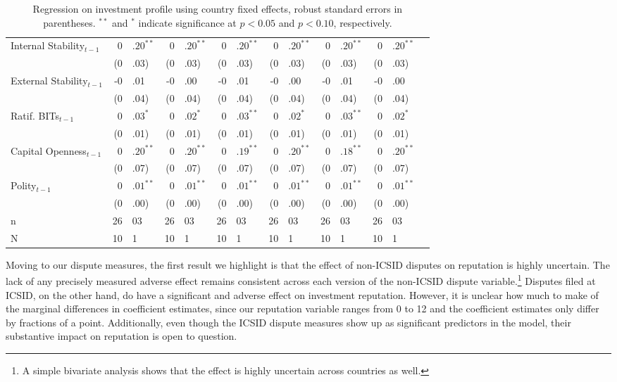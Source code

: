 \documentclass[12pt,onesided]{amsart}
\begin{document}
\begin{table}[ht]
{\begin{tabular}{lr@{} lr@{}lr@{}lr@{} lr@{}lr@{}lr@{} }
  Internal Stability$_{t-1}$ & $0$&$.20^{\ast\ast}$ & $0$&$.20^{\ast\ast}$ & $0$&$.20^{\ast\ast}$ & $0$&$.20^{\ast\ast}$ & $0$&$.20^{\ast\ast}$ & $0$&$.20^{\ast\ast}$ \\ 
   & (0&.03) & (0&.03) & (0&.03) & (0&.03) & (0&.03) & (0&.03) \\ 
  External Stability$_{t-1}$ & -0&.01 & -0&.00 & -0&.01 & -0&.00 & -0&.01 & -0&.00 \\ 
   & (0&.04) & (0&.04) & (0&.04) & (0&.04) & (0&.04) & (0&.04) \\ 
  Ratif. BITs$_{t-1}$ & $0$&$.03^{\ast}$ & $0$&$.02^{\ast}$ & $0$&$.03^{\ast\ast}$ & $0$&$.02^{\ast}$ & $0$&$.03^{\ast\ast}$ & $0$&$.02^{\ast}$ \\ 
   & (0&.01) & (0&.01) & (0&.01) & (0&.01) & (0&.01) & (0&.01) \\ 
  Capital Openness$_{t-1}$ & $0$&$.20^{\ast\ast}$ & $0$&$.20^{\ast\ast}$ & $0$&$.19^{\ast\ast}$ & $0$&$.20^{\ast\ast}$ & $0$&$.18^{\ast\ast}$ & $0$&$.20^{\ast\ast}$ \\ 
   & (0&.07) & (0&.07) & (0&.07) & (0&.07) & (0&.07) & (0&.07) \\ 
  Polity$_{t-1}$ & $0$&$.01^{\ast\ast}$ & $0$&$.01^{\ast\ast}$ & $0$&$.01^{\ast\ast}$ & $0$&$.01^{\ast\ast}$ & $0$&$.01^{\ast\ast}$ & $0$&$.01^{\ast\ast}$ \\ 
   & (0&.00) & (0&.00) & (0&.00) & (0&.00) & (0&.00) & (0&.00) \\ 
   \hline
n & 26&03 & 26&03 & 26&03 & 26&03 & 26&03 & 26&03 \\ 
  N & 10&1 & 10&1 & 10&1 & 10&1 & 10&1 & 10&1 \\ 
   \hline
\hline
\end{tabular}
}
\caption{Regression on investment profile using country fixed effects, robust standard errors in parentheses. $^{**}$ and $^{*}$ indicate significance at $p< 0.05 $ and $p< 0.10 $, respectively.} 
\label{tab:dispRepLevel}
\end{table}

Moving to our dispute measures, the first result we highlight is that the effect of non-ICSID disputes on reputation is highly uncertain. The lack of any precisely measured adverse effect remains consistent across each version of the non-ICSID dispute variable.\footnote{A simple bivariate analysis shows that the effect is highly uncertain across countries as well.} Disputes filed at ICSID, on the other hand, do have a significant and adverse effect on investment reputation. However, it is unclear how much to make of the marginal differences in coefficient estimates, since our reputation variable ranges from 0 to 12 and the coefficient estimates only differ by fractions of a point. Additionally, even though the ICSID dispute measures show up as significant predictors in the model, their substantive impact on reputation is open to question. 
\end{document}
